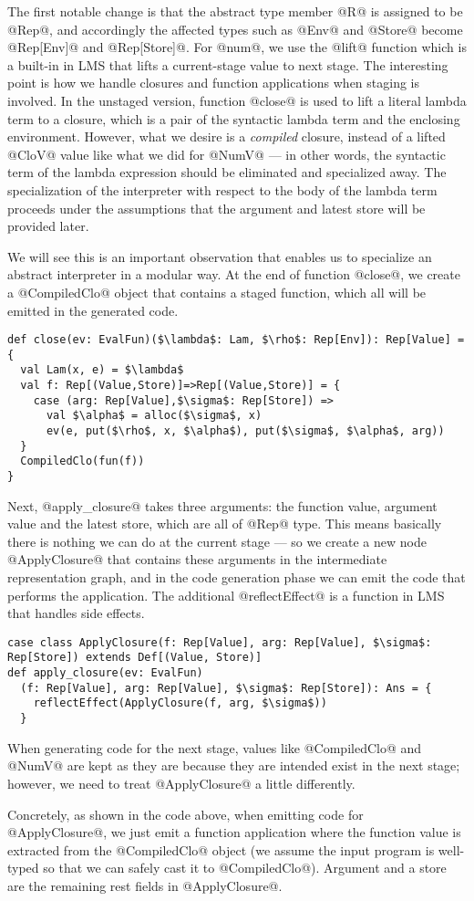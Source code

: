 The first notable change is that the abstract type member @R@ is assigned to be
@Rep@, and accordingly the affected types such as @Env@ and @Store@ become
@Rep[Env]@ and @Rep[Store]@. For @num@, we use the @lift@ function which is a
built-in in LMS that lifts a current-stage value to next stage. The interesting
point is how we handle closures and function applications when staging is
involved. In the unstaged version, function @close@ is used to lift a literal
lambda term to a closure, which is a pair of the syntactic lambda term and the
enclosing environment. However, what we desire is a \textit{compiled} closure,
instead of a lifted @CloV@ value like what we did for @NumV@ --- in other words,
the syntactic term of the lambda expression should be eliminated and specialized
away. The specialization of the interpreter with respect to the body of the
lambda term proceeds under the assumptions that the argument and latest store
will be provided later.

We will see this is an important observation that enables us to specialize an
abstract interpreter in a modular way. At the end of function @close@, we create
a @CompiledClo@ object that contains a staged function, which all will be
emitted in the generated code.

\begin{lstlisting}
def close(ev: EvalFun)($\lambda$: Lam, $\rho$: Rep[Env]): Rep[Value] = {
  val Lam(x, e) = $\lambda$
  val f: Rep[(Value,Store)]=>Rep[(Value,Store)] = { 
    case (arg: Rep[Value],$\sigma$: Rep[Store]) =>
      val $\alpha$ = alloc($\sigma$, x)
      ev(e, put($\rho$, x, $\alpha$), put($\sigma$, $\alpha$, arg)) 
  }
  CompiledClo(fun(f))
}
\end{lstlisting}

Next, @apply_closure@ takes three arguments: the function value, argument value
and the latest store, which are all of @Rep@ type. This means basically there
is nothing we can do at the current stage --- so we create a new node
@ApplyClosure@ that contains these arguments in the intermediate representation
graph, and in the code generation phase we can emit the code that performs the
application. The additional @reflectEffect@ is a function in LMS that handles
side effects.

\begin{lstlisting}
case class ApplyClosure(f: Rep[Value], arg: Rep[Value], $\sigma$: Rep[Store]) extends Def[(Value, Store)]
def apply_closure(ev: EvalFun)
  (f: Rep[Value], arg: Rep[Value], $\sigma$: Rep[Store]): Ans = {
    reflectEffect(ApplyClosure(f, arg, $\sigma$))
  }
\end{lstlisting}


When generating code for the next stage, values like @CompiledClo@ and @NumV@
are kept as they are because they are intended exist in the next stage; however,
we need to treat @ApplyClosure@ a little differently.

Concretely, as shown in the code above, when emitting code for @ApplyClosure@,
we just emit a function application where the function value is extracted from
the @CompiledClo@ object (we assume the input program is well-typed so that we
can safely cast it to @CompiledClo@). Argument and a store are the remaining rest
fields in @ApplyClosure@.